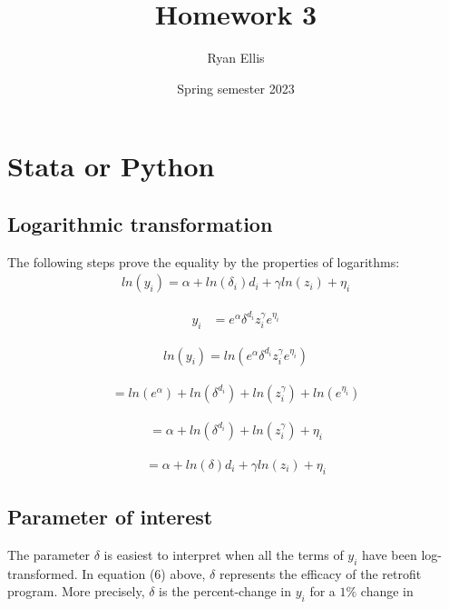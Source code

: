\documentclass{article}
\title{Homework 3}
\author{Ryan Ellis}
\date{Spring semester 2023}
\begin{document}
  
\maketitle

\section{Stata or Python}

\subsection{Logarithmic transformation}
The following steps prove the equality by the properties of logarithms:
\begin{align}
    ln{(y_i)} = \alpha + ln{(\delta_i)} d_i + \gamma ln{(z_i)} + \eta_i
\end{align}

\begin{align}
    y_i &= e^\alpha \delta^{d_i} z^\gamma_i e^{\eta_i}
\end{align}

\begin{align}
    ln{(y_i)} = ln{(e^\alpha \delta^{d_i} z^\gamma_i e^{\eta_i})}
\end{align}

\begin{align}
    = ln{(e^\alpha)} + ln{(\delta^{d_i})} + ln{(z^\gamma_i)} + ln{(e^{\eta_i})}
\end{align}

\begin{align}
    = \alpha + ln{(\delta^{d_i})} + ln{(z^\gamma_i)} + \eta_i
\end{align}

\begin{align}
    = \alpha + ln{(\delta)}d_i + \gamma ln{(z_i)} + \eta_i
\end{align}

\subsection{Parameter of interest}

The parameter $\delta$ is easiest to interpret when all the terms of $y_i$ have been log-transformed. In equation (6) above, $\delta$ represents the efficacy of the retrofit program. More precisely, $\delta$ is the percent-change in $y_i$ for a $1\%$ change in 
\end{document}
